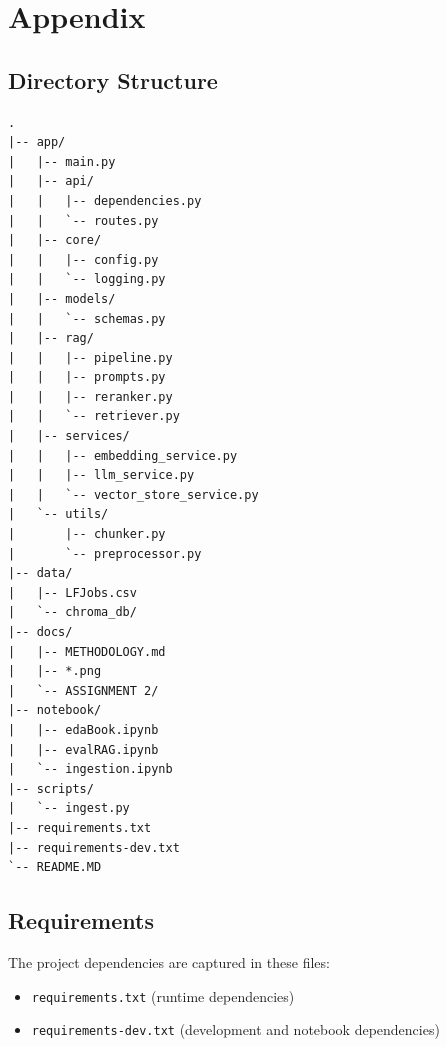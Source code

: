 ﻿\documentclass{article}
\begin{document}
\clearpage

\newpage	

\appendix
\section{Appendix}

\subsection{Directory Structure}
\begin{verbatim}
.
|-- app/
|   |-- main.py
|   |-- api/
|   |   |-- dependencies.py
|   |   `-- routes.py
|   |-- core/
|   |   |-- config.py
|   |   `-- logging.py
|   |-- models/
|   |   `-- schemas.py
|   |-- rag/
|   |   |-- pipeline.py
|   |   |-- prompts.py
|   |   |-- reranker.py
|   |   `-- retriever.py
|   |-- services/
|   |   |-- embedding_service.py
|   |   |-- llm_service.py
|   |   `-- vector_store_service.py
|   `-- utils/
|       |-- chunker.py
|       `-- preprocessor.py
|-- data/
|   |-- LFJobs.csv
|   `-- chroma_db/
|-- docs/
|   |-- METHODOLOGY.md
|   |-- *.png
|   `-- ASSIGNMENT 2/
|-- notebook/
|   |-- edaBook.ipynb
|   |-- evalRAG.ipynb
|   `-- ingestion.ipynb
|-- scripts/
|   `-- ingest.py
|-- requirements.txt
|-- requirements-dev.txt
`-- README.MD
\end{verbatim}

\subsection{Requirements}
The project dependencies are captured in these files:
\begin{itemize}
	\item \texttt{requirements.txt} (runtime dependencies)
	\item \texttt{requirements-dev.txt} (development and notebook dependencies)
\end{itemize}
\end{document}
